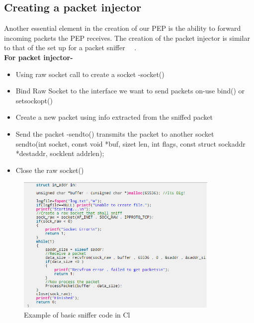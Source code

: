 \subsection{Creating a packet injector}
Another essential element in the creation of our PEP is the ability to forward incoming packets the PEP receives.  
The creation of the packet injector is similar to that of the set up for a packet sniffer ~\cite{35}~\cite{38}.  \\

\textbf{For packet injector-}\\
    \begin{itemize}
        \item Using raw socket call to create a socket -socket()
        \item Bind Raw Socket to the interface we want to send packets on-use bind() or setsockopt()
        \item Create a new packet using info extracted from the sniffed packet
        \item Send the packet -sendto() transmits the packet to another socket \\
sendto(int socket, const void *buf, size\textunderscore t len, int flags,
               const struct sockaddr *dest\textunderscore addr, socklen\textunderscore t addrlen);        
        \item Close the raw socket()\\
    \end{itemize}

\begin{figure}[h!]
    \centering
    \includegraphics[width=0.87\textwidth]{SnifferCode.PNG}
    \caption{Example of basic sniffer code in Cl
    }
    \label{fig:Sniffer code in C}
\end{figure}

